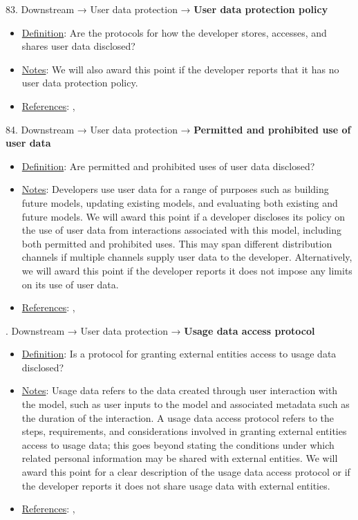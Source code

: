83. Downstream → User data protection → \textbf{User data protection policy}
\vspace{-\parskip}
\begin{itemize}
	\item
	\underline{Definition}: Are the protocols for how the developer stores, accesses, and shares user data disclosed?
	\item
	\underline{Notes}: We will also award this point if the developer reports that it has no user data protection policy.
	\item
	\underline{References}: \citet{nissenbaum2004contextual}, \citet{king2020privacy}
\end{itemize}


84. Downstream → User data protection → \textbf{Permitted and prohibited use of user data}
\vspace{-\parskip}
\begin{itemize}
	\item
	\underline{Definition}: Are permitted and prohibited uses of user data disclosed?
	\item
	\underline{Notes}: Developers use user data for a range of purposes such as building future models, updating existing models, and evaluating both existing and future models. We will award this point if a developer discloses its policy on the use of user data from interactions associated with this model, including both permitted and prohibited uses. This may span different distribution channels if multiple channels supply user data to the developer. Alternatively, we will award this point if the developer reports it does not impose any limits on its use of user data.
	\item
	\underline{References}: \citet{nissenbaum2004contextual}, \citet{king2020privacy}
\end{itemize}


. Downstream → User data protection → \textbf{Usage data access protocol}
\vspace{-\parskip}
\begin{itemize}
	\item
	\underline{Definition}: Is a protocol for granting external entities access to usage data disclosed?
	\item
	\underline{Notes}: Usage data refers to the data created through user interaction with the model, such as user inputs to the model and associated metadata such as the duration of the interaction. A usage data access protocol refers to the steps, requirements, and considerations involved in granting external entities access to usage data; this goes beyond stating the conditions under which related personal information may be shared with external entities. We will award this point for a clear description of the usage data access protocol or if the developer reports it does not share usage data with external entities.
	\item
	\underline{References}: \citet{lapowsky2018cambridge}, \citet{king2020privacy}
\end{itemize}


